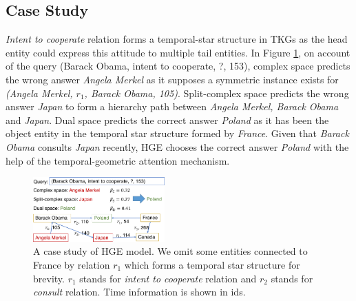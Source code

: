 \documentclass[letterpaper]{article} %
\begin{document}
\subsection{Case Study}
\textit{Intent to cooperate} relation forms a temporal-star structure in TKGs as the head entity could express this attitude to multiple tail entities. In Figure \ref{fig:case_study}, on account of the query (Barack Obama, intent to cooperate, ?, 153), complex space predicts the wrong answer \textit{Angela Merkel} as it supposes a symmetric instance exists for \textit{(Angela Merkel, $r_1$, Barack Obama, 105)}. Split-complex space predicts the wrong answer \textit{Japan} to form a hierarchy path between \textit{Angela Merkel, Barack Obama} and \textit{Japan}. Dual space predicts the correct answer \textit{Poland} as it has been the object entity in the temporal star structure formed by \textit{France}. Given that \textit{Barack Obama} consults \textit{Japan} recently, HGE chooses the correct answer \textit{Poland} with the help of the temporal-geometric attention mechanism.

\begin{figure}[t]
    \centering
    \includegraphics[width=0.45\textwidth]{MetaE_case_study.pdf}
    \caption{A case study of HGE model. We omit some entities connected to France by relation $r_{1}$ which forms a temporal star structure for brevity. $r_{1}$ stands for \textit{intent to cooperate} relation and $r_{2}$ stands for \textit{consult} relation. Time information is shown in ids.
    }
    \label{fig:case_study}
\end{figure}
\end{document}
